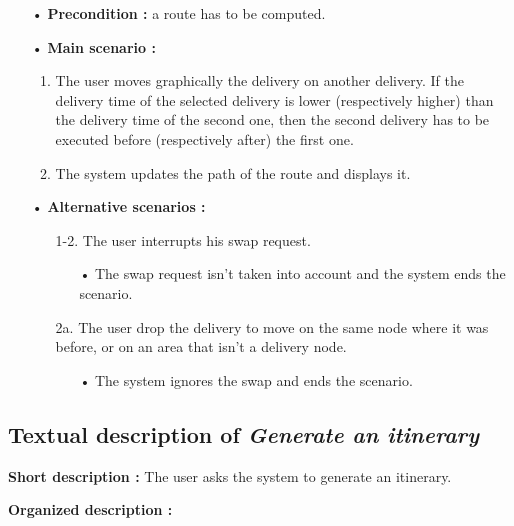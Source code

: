 \documentclass[paper=a4, fontsize=11pt]{report}
\numberwithin{equation}{section}		%
\numberwithin{figure}{section}		%
\numberwithin{table}{section}		%
\renewcommand{\it}[1]{\textit{#1}}
\begin{document}
\begin{itemize}
  \item[•] \textbf{Precondition :} a route has to be computed.
  \item[•] \textbf{Main scenario :}
  \begin{enumerate}
    \item The user moves graphically the delivery on another delivery. If the delivery time of the selected delivery is lower (respectively higher) than the delivery time of the second one, then the second delivery has to be executed before (respectively after) the first one.
    \item The system updates the path of the route and displays it.
  \end{enumerate}
  \item[•] \textbf{Alternative scenarios :}
  \begin{itemize}
    \item[1-2.] The user interrupts his swap request.
    \begin{itemize}
      \item[•] The swap request isn’t taken into account and the system ends the scenario.
    \end{itemize}
    \item[2a.]  The user drop the delivery to move on the same node where it was before, or on an area that isn’t a delivery node.
    \begin{itemize}
      \item[•] The system ignores the swap and ends the scenario.
    \end{itemize}
  \end{itemize}
\end{itemize}

\subsection{Textual description of \it{Generate an itinerary}}
\label{subsec:textual-description-of-generate-an-itinerary}

\textbf{Short description :} The user asks the system to generate an itinerary.

\textbf{Organized description :}
\end{document}
